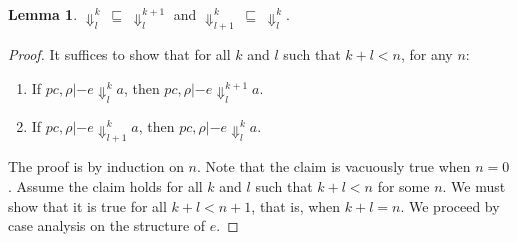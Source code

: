 \documentclass{article}
\theoremstyle{definition}
\newtheorem{lemma}{Lemma}
\newcommand{\pc}{\ensuremath{{\mathit{pc}}}}
\begin{document}
\begin{lemma}
  $\Downarrow^{k}_{l}\ \sqsubseteq\ \Downarrow^{k+1}_{l}$
  and
  $\Downarrow^{k}_{l+1}\ \sqsubseteq\ \Downarrow^{k}_{l}$.
  \label{lem:semantics-step}
\end{lemma}
\begin{proof}%
  It suffices to show that for all $k$ and $l$ such that $k + l < n$, for
  any $n$:
  \begin{enumerate}
  \item If $\pc, \rho |- e \Downarrow^{k}_{l} a$, then
    $\pc, \rho |- e \Downarrow^{k+1}_{l} a$.
  \item If $\pc, \rho |- e \Downarrow^{k}_{l+1} a$, then
    $\pc, \rho |- e \Downarrow^{k}_{l} a$.
  \end{enumerate}
  The proof is by induction on $n$. Note that the claim is vacuously true
  when $n = 0$. Assume the claim holds for all $k$ and $l$ such that
  $k + l < n$ for some $n$. We must show that it is true for all
  $k + l < n + 1$, that is, when $k + l = n$. We proceed by case analysis
  on the structure of $e$.


\end{proof}
\end{document}

